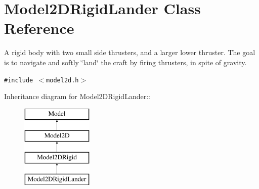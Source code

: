 \section{Model2DRigid\-Lander  Class Reference}
\label{class_Model2DRigidLander}
A rigid body with two small side thrusters, and a larger lower thruster. The goal is to navigate and softly \char`\"{}land\char`\"{} the craft by firing thrusters, in spite of gravity. 


{\tt \#include $<$model2d.h$>$}

Inheritance diagram for Model2DRigid\-Lander::\begin{figure}[H]
\begin{center}
\leavevmode
\includegraphics[height=4cm]{class_Model2DRigidLander}
\end{center}
\end{figure}
